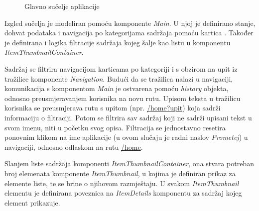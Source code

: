 \documentclass[times, utf8, zavrsni, numeric]{fer}
\newcommand{\razmakp}{\vspace{18pt}}
\newcommand{\razmaks}{\vspace{10pt}}
\begin{document}
\razmaks

\begin{figure}[htb]
\centering
{}
\caption{Glavno sučelje aplikacije}
\label{fig:screenshot-main}
\end{figure}

\razmaks

Izgled sučelja je modeliran pomoću komponente \emph{Main}.
U njoj je definirano stanje, dohvat podataka i navigacija po kategorijama sadržaja pomoću kartica .
Također je definirana i logika filtracije sadržaja kojeg šalje kao listu u komponentu \emph{ItemThumbnailContainer}.

Sadržaj se filtrira navigacijom karticama po kategoriji i s obzirom na upit iz tražilice komponente \emph{Navigation}. 
Budući da se tražilica nalazi u navigaciji, komunikacija s komponentom \emph{Main} je ostvarena pomoću \emph{history} objekta, odnosno preusmjeravanjem korisnika na novu rutu.
Upisom teksta u tražilicu korisnika se preusmjerava rutu s upitom (npr. \glqq \url{/home?upit}\grqq ) koja sadrži informaciju o filtraciji.
Potom se filtrira sav sadržaj koji ne sadrži upisani tekst u svom imenu, niti u početku svog opisa.
Filtracija se jednostavno resetira ponovnim klikom na ime aplikacije (u ovom slučaju je radni naslov \emph{Prometej}) u navigaciji, odnosno odlaskom na rutu \glqq \url{/home}\grqq .

Slanjem liste sadržaja komponenti \emph{ItemThumbnailContainer}, ona stvara potreban broj elemenata komponente \emph{ItemThumbnail}, u kojima je definiran prikaz za elemente liste, te se brine o njihovom razmještaju.
U svakom \emph{ItemThumbnail} elementu je definirana poveznica na \emph{ItemDetails} komponentu za sadržaj kojeg element prikazuje.

\razmakp
\end{document}
